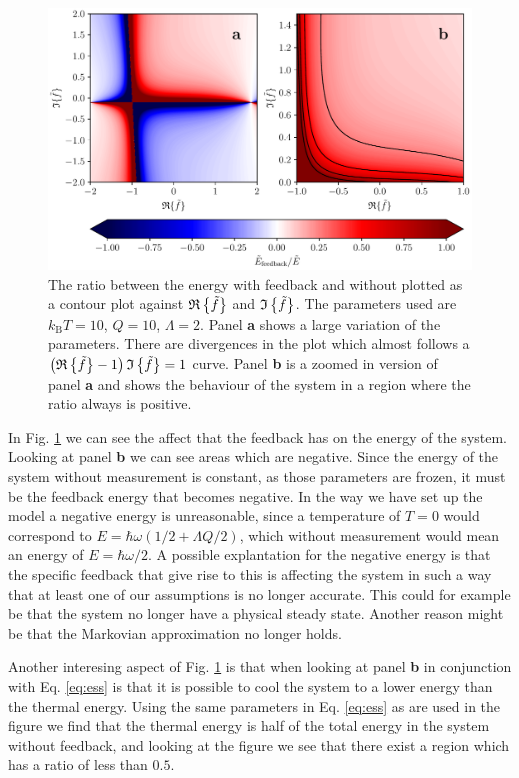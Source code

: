 \begin{figure}
    \centering
    \includegraphics[width=\textwidth]{figures/energyFeedbackRatio.pdf}
    \caption{\small The ratio between the energy with feedback and without plotted as a contour plot against $\mathfrak{R}\left\{\tilde{f}\right\}$ and $\mathfrak{I}\left\{\tilde{f}\right\}$. The parameters used are $k_\text{B}T = 10$, $Q = 10$, $\Lambda = 2$. Panel \textbf{a} shows a large variation of the parameters. There are divergences in the plot which almost follows a $\left(\mathfrak{R}\left\{\tilde{f}\right\} - 1 \right)\mathfrak{I}\left\{\tilde{f}\right\} = 1$ curve. Panel \textbf{b} is a zoomed in version of panel \textbf{a} and shows the behaviour of the system in a region where the ratio always is positive.}
    \label{fig:energyFeedbackRatio}
\end{figure}
In Fig. \ref{fig:energyFeedbackRatio} we can see the affect that the feedback has on the energy of the system. Looking at panel \textbf{b} we can see areas which are negative. Since the energy of the system without measurement is constant, as those parameters are frozen, it must be the feedback energy that becomes negative. In the way we have set up the model a negative energy is unreasonable, since a temperature of $T=0$ would correspond to $E =\hbar\omega( 1/2 + \Lambda Q/2)$, which without measurement would mean an energy of $E = \hbar\omega/2$. A possible explantation for the negative energy is that the specific feedback that give rise to this is affecting the system in such a way that at least one of our assumptions is no longer accurate. This could for example be that the system no longer have a physical steady state. Another reason might be that the Markovian approximation no longer holds.

Another interesing aspect of Fig. \ref{fig:energyFeedbackRatio} is that when looking at panel \textbf{b} in conjunction with Eq. \eqref{eq:ess} is that it is possible to cool the system to a lower energy than the thermal energy. Using the same parameters in Eq. \eqref{eq:ess} as are used in the figure we find that the thermal energy is half of the total energy in the system without feedback, and looking at the figure we see that there exist a region which has a ratio of less than $0.5$.


